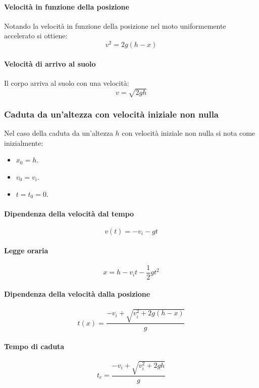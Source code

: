 			\paragraph{Velocit\`a in funzione della posizione}
			Notando la velocit\`a in funzione della posizione nel moto uniformemente accelerato si ottiene:
			$$v^2=2g(h-x)$$

			\paragraph{Velocit\`a di arrivo al suolo}
			Il corpo arriva al suolo con una velocit\`a:
			$$v=\sqrt{2gh}$$

		\subsubsection{Caduta da un'altezza con velocit\`a iniziale non nulla}
		Nel caso della caduta da un'altezza $h$ con velocit\`a iniziale non nulla si nota come inizialmente:
		\begin{multicols}{3}
			\begin{itemize}
				\item $x_0=h$.
				\item $v_0=v_i$.
				\item $t=t_0=0$.
			\end{itemize}
		\end{multicols}

			\paragraph{Dipendenza della velocit\`a dal tempo}
			$$v(t) = -v_i -gt$$

			\paragraph{Legge oraria}
			$$x=h-v_it-\dfrac{1}{2}gt^2$$

			\paragraph{Dipendenza della velocit\`a dalla posizione}
			$$t(x) = \dfrac{-v_i+\sqrt{v_i^2+2g(h-x)}}{g}$$

			\paragraph{Tempo di caduta}
			$$t_c = \dfrac{-v_i+\sqrt{v_i^2+2gh}}{g}$$


